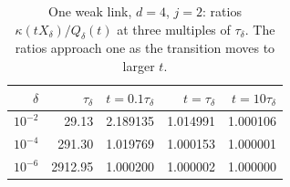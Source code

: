 \begin{table}[h!]
\caption{One weak link, $d=4$, $j=2$: ratios $\kappa(tX_\delta)/Q_\delta(t)$
at three multiples of $\tau_\delta$. The ratios approach one as the
transition moves to larger $t$.}
\label{tab:weaklink}
\centering
\begin{tabular}{rrrrr}
$\delta$ & $\tau_\delta$ & $t=0.1\tau_\delta$ & $t=\tau_\delta$ & $t=10\tau_\delta$\\
\hline
 $10^{-2}$ & 29.13 & 2.189135 & 1.014991 & 1.000106 \\
 $10^{-4}$ & 291.30 & 1.019769 & 1.000153 & 1.000001 \\
 $10^{-6}$ & 2912.95 & 1.000200 & 1.000002 & 1.000000 \\
\end{tabular}
\end{table}
